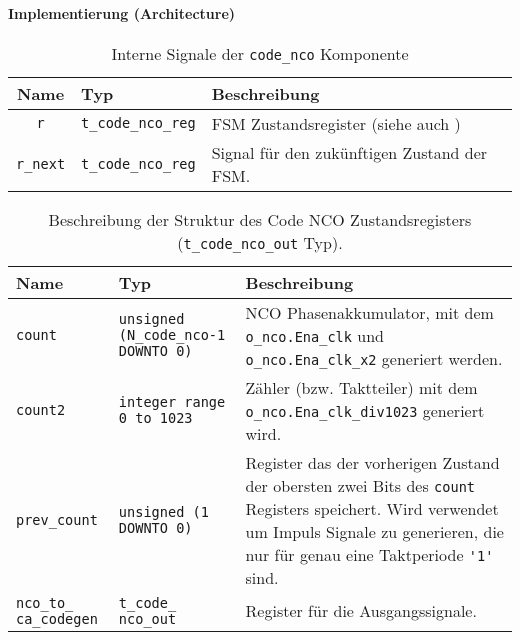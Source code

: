 \paragraph{Implementierung (Architecture)}

\begin{table}[htbp]
    \ttabbox
    {
        \caption[Code NCO interne Signale]{Interne Signale der \lstinline$code_nco$ Komponente}
        \label{TabCodeNCO_ArchSignals}
    }
    {
    \begin{tabular}{c  l p{5cm}}
        \toprule
        Name      & Typ         & Beschreibung \\
        \midrule
        \lstinline$r$		& \lstinline$t_code_nco_reg$	& \gls{FSM} Zustandsregister (siehe auch \TR{Tab_t_code_nco_reg_Type})\\
        \lstinline$r_next$	& \lstinline$t_code_nco_reg$	& Signal für den zukünftigen Zustand der \gls{FSM}.\\
        \bottomrule
    \end{tabular}
}
\end{table}

\begin{table}[htbp]
    \ttabbox
    {
        \caption[Typdefinition \lstinline$t_code_nco_out$]{Beschreibung der Struktur des Code NCO Zustandsregisters (\lstinline$t_code_nco_out$ Typ).}
        \label{Tab_t_code_nco_reg_Type}
    }
    {
    \begin{tabular}{p{2cm}  p{2cm} p{6cm}}
        \toprule
        Name				& Typ						& Beschreibung \\
        \midrule
        \lstinline$count$		& \lstinline$unsigned (N_code_nco-1 DOWNTO 0)$	& NCO Phasenakkumulator, mit dem \lstinline$o_nco.Ena_clk$ und \lstinline$o_nco.Ena_clk_x2$ generiert werden. \\
        \lstinline$count2$		& \lstinline$integer range 0 to 1023$		& Zähler (bzw. Taktteiler) mit dem \lstinline$o_nco.Ena_clk_div1023$ generiert wird. \\
        \lstinline$prev_count$		& \lstinline$unsigned (1 DOWNTO 0)$		& Register das der vorherigen Zustand der obersten zwei Bits des  \lstinline$count$  Registers speichert. Wird verwendet um Impuls Signale zu generieren, die nur für genau eine Taktperiode \lstinline$'1'$ sind. \\
        \lstinline$nco_to_ ca_codegen$	& \lstinline$t_code_ nco_out$			& Register für die Ausgangssignale.\\
        \bottomrule
    \end{tabular}
}
\end{table}

